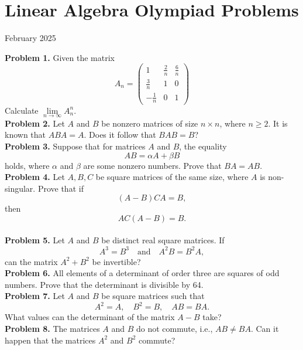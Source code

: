 \documentclass{article}
\begin{document}
\pagestyle{plain}

\section*{Linear Algebra Olympiad Problems}

\begin{center}
February 2025
\end{center}

\textbf{Problem 1.}
Given the matrix
\[
A_n = \begin{pmatrix}
1 & \frac{2}{n} & \frac{6}{n} \\
\frac{3}{n} & 1 & 0 \\
-\frac{1}{n} & 0 & 1
\end{pmatrix}
\]
Calculate \( \lim\limits_{n \to \infty} A_n^n \).
\\

\textbf{Problem 2.}
Let \( A \) and \( B \) be nonzero matrices of size \( n \times n \), where \( n \geq 2 \).
It is known that \( ABA = A \). Does it follow that \( BAB = B \)?
\\

\textbf{Problem 3.}
Suppose that for matrices \( A \) and \( B \), the equality
\[
AB = \alpha A + \beta B
\]
holds, where \( \alpha \) and \( \beta \) are some nonzero numbers. Prove that \( BA = AB \).
\\

\textbf{Problem 4.}
Let \( A, B, C \) be square matrices of the same size, where \( A \) is non-singular. Prove that if
\[
(A - B)CA = B,
\]
then
\[
AC(A - B) = B.
\]
\\

\textbf{Problem 5.}
Let \( A \) and \( B \) be distinct real square matrices. If
\[
A^3 = B^3 \quad \text{and} \quad A^2 B = B^2 A,
\]
can the matrix \( A^2 + B^2 \) be invertible?
\\

\textbf{Problem 6.}
All elements of a determinant of order three are squares of odd numbers.
Prove that the determinant is divisible by 64.
\\

\textbf{Problem 7.}
Let \( A \) and \( B \) be square matrices such that
\[
A^2 = A, \quad B^2 = B, \quad AB = BA.
\]
What values can the determinant of the matrix \( A - B \) take?
\\

\textbf{Problem 8.}
The matrices \( A \) and \( B \) do not commute, i.e., \( AB \neq BA \). Can it happen that the matrices \( A^2 \) and \( B^2 \) commute?
\\
\end{document}
